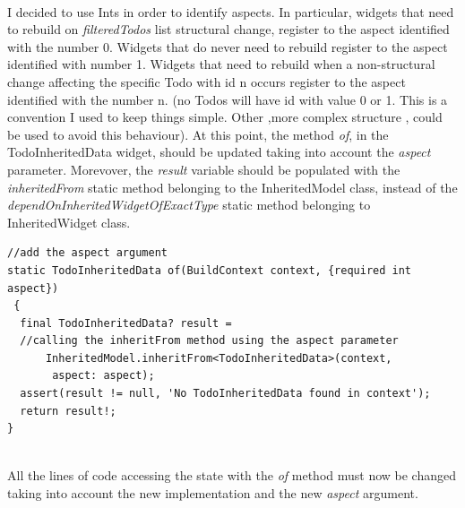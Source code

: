 \mbox{}\\
I decided to use Ints in order to identify aspects. In particular, widgets that need to rebuild on \textit{filteredTodos} list structural change, register to the aspect identified with the number 0. Widgets that do never need to rebuild register to the aspect identified with number 1. Widgets that need to rebuild when a non-structural change affecting the specific Todo with id n occurs register to the aspect identified with the number n. (no Todos will have id with value 0 or 1. This is a convention I used to keep things simple. Other ,more complex structure , could be used to avoid this behaviour). 
At this point, the method \textit{of}, in the TodoInheritedData widget, should be updated taking into account the \textit{aspect} parameter. Morevover, the \textit{result} variable should be populated with the \textit{inheritedFrom} static method belonging to the InheritedModel class, instead of the \textit{dependOnInheritedWidgetOfExactType} static method belonging to InheritedWidget class.
\mbox{}\\
\begin{code}
\mbox{}
\label{code:2.45}
\begin{verbatim}
//add the aspect argument
static TodoInheritedData of(BuildContext context, {required int aspect})
 {
  final TodoInheritedData? result =
  //calling the inheritFrom method using the aspect parameter
      InheritedModel.inheritFrom<TodoInheritedData>(context,
       aspect: aspect);
  assert(result != null, 'No TodoInheritedData found in context');
  return result!;
}
\end{verbatim}
\end{code}
\mbox{}\\
All the lines of code accessing the state with the \textit{of} method must now be changed taking into account the new implementation and the new \textit{aspect} argument.
\mbox{}\\

